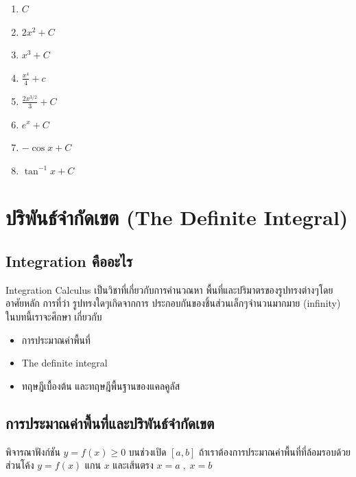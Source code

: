 \documentclass[
]{book}
\theoremstyle{definition}
\theoremstyle{definition}
\theoremstyle{definition}
\theoremstyle{definition}
\theoremstyle{remark}
\begin{document}
\begin{enumerate}
\def\labelenumi{\arabic{enumi}.}
\item
  \(C\)
\item
  \(2x^{2} + C\)
\item
  \(x^{3} + C\)
\item
  \(\displaystyle \frac{x^{4}}{4}+c\)
\item
  \(\displaystyle \frac{2x^{3/2}}{3} + C\)
\item
  \(e^{x} + C\)
\item
  \(-\cos x + C\)
\item
  \(\tan^{-1}x + C\)
\end{enumerate}

\section{ปริพันธ์จำกัดเขต (The Definite Integral)}\label{uxe1buxe23uxe1euxe19uxe18uxe08uxe33uxe01uxe14uxe40uxe02uxe15-the-definite-integral}

\subsection{Integration คืออะไร}\label{integration-uxe04uxe2duxe2duxe30uxe44uxe23}

Integration Calculus เป็นวิชาที่เกี่ยวกับการคำนวณหา
พื้นที่และปริมาตรของรูปทรงต่างๆโดยอาศัยหลัก การที่ว่า รูปทรงใดๆเกิดจากการ
ประกอบกันของชิ้นส่วนเล็กๆจำนวนมากมาย (infinity) ในบทนี้เราจะศึกษา เกี่ยวกับ

\begin{itemize}
\item
  การประมาณค่าพื้นที่
\item
  The definite integral
\item
  ทฤษฎีเบื้องต้น และทฤษฎีพื้นฐานของแคลคูลัส
\end{itemize}

\subsection{การประมาณค่าพื้นที่และปริพันธ์จำกัดเขต}\label{uxe01uxe32uxe23uxe1buxe23uxe30uxe21uxe32uxe13uxe04uxe32uxe1euxe19uxe17uxe41uxe25uxe30uxe1buxe23uxe1euxe19uxe18uxe08uxe33uxe01uxe14uxe40uxe02uxe15}

พิจารณาฟังก์ชัน \(y=f(x) \ge 0\) บนช่วงเปิด \([a,b]\)
ถ้าเราต้องการประมาณค่าพื้นที่ที่ล้อมรอบด้วยส่วนโค้ง \(y=f(x)\) แกน \(x\) และเส้นตรง
\(x=a\;,\;x=b\)\\
\end{document}
